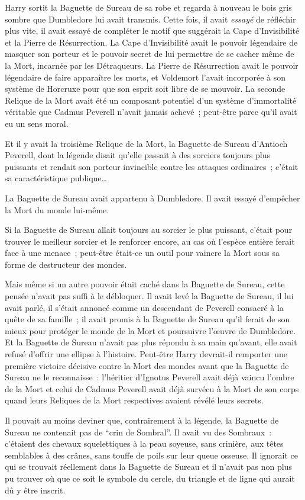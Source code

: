 Harry sortit la Baguette de Sureau de sa robe et regarda à nouveau le bois gris sombre que Dumbledore lui avait transmis. Cette fois, il avait \emph{essayé} de réfléchir plus vite, il avait essayé de compléter le motif que suggérait la Cape d'Invisibilité et la Pierre de Résurrection. La Cape d'Invisibilité avait le pouvoir légendaire de masquer son porteur et le pouvoir secret de lui permettre de se cacher même de la Mort, incarnée par les Détraqueurs. La Pierre de Résurrection avait le pouvoir légendaire de faire apparaître les morts, et Voldemort l'avait incorporée à son système de Horcruxe pour que son esprit soit libre de se mouvoir. La seconde Relique de la Mort avait été un composant potentiel d'un système d'immortalité véritable que Cadmus Peverell n'avait jamais achevé~; peut-être parce qu'il avait eu un sens moral.

Et il y avait la troisième Relique de la Mort, la Baguette de Sureau d'Antioch Peverell, dont la légende disait qu'elle passait à des sorciers toujours plus puissants et rendait son porteur invincible contre les attaques ordinaires~; c'était sa caractéristique publique…

La Baguette de Sureau avait appartenu à Dumbledore. Il avait essayé d'empêcher la Mort du monde lui-même.

Si la Baguette de Sureau allait toujours au sorcier le plus puissant, c'était pour trouver le meilleur sorcier et le renforcer encore, au cas où l'espèce entière ferait face à une menace~; peut-être était-ce un outil pour vaincre la Mort sous sa forme de destructeur des mondes.

Mais même si un autre pouvoir était caché dans la Baguette de Sureau, cette pensée n'avait pas suffi à le débloquer. Il avait levé la Baguette de Sureau, il lui avait parlé, il s'était annoncé comme un descendant de Peverell consacré à la quête de sa famille~; il avait promis à la Baguette de Sureau qu'il ferait de son mieux pour protéger le monde de la Mort et poursuivre l'œuvre de Dumbledore. Et la Baguette de Sureau n'avait pas plus répondu à sa main qu'avant, elle avait refusé d'offrir une ellipse à l'histoire. Peut-être Harry devrait-il remporter une première victoire décisive contre la Mort des mondes avant que la Baguette de Sureau ne le reconnaisse~: l'héritier d'Ignotus Peverell avait déjà vaincu l'ombre de la Mort et celui de Cadmus Peverell avait déjà survécu à la Mort de son corps quand leurs Reliques de la Mort respectives avaient révélé leurs secrets.

Il pouvait au moins deviner que, contrairement à la légende, la Baguette de Sureau ne contenait pas de “crin de Sombral”. Il avait vu des Sombraux~: c'étaient des chevaux squelettiques à la peau soyeuse, sans crinière, aux têtes semblables à des crânes, sans touffe de poils sur leur queue osseuse. Il ignorait ce qui se trouvait réellement dans la Baguette de Sureau et il n'avait pas non plus pu trouver où que ce soit le symbole du cercle, du triangle et de ligne qui aurait dû y être inscrit.


